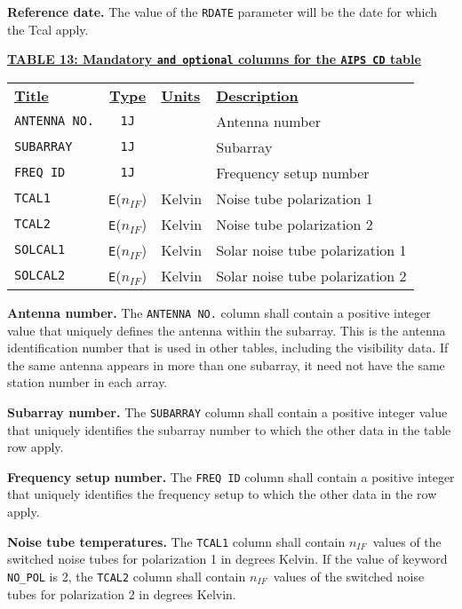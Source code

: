 \documentclass[twoside]{article}
\newcommand{\Hi}[1]{\textcolor{hicol}{#1}}
\newcommand{\nif}{$n_{IF}$}
\begin{document}
{\bf Reference date.} The value of the {\tt RDATE} parameter will be
the date for which the Tcal apply.

\begin{center}
\underline{\bf{TABLE 13: Mandatory \Hi{{\tt and optional}} columns for the {\tt AIPS CD} table}}\\
\begin{tabular}{lcll}
\noalign{\vspace{2pt}} \label{ta:CDcols}
\underline{{\bf Title\vphantom{y}}} & \underline{\bf{Type}} &
   \underline{{\bf Units\vphantom{y}}} & \underline{\bf{Description}} \\
\noalign{\vspace{2pt}}
{\tt ANTENNA NO.} & {\tt 1J} &  & Antenna number \\
{\tt SUBARRAY}    & {\tt 1J} &  & Subarray \\
{\tt FREQ ID}     & {\tt 1J} &  & Frequency setup number \\
{\tt TCAL1}       & {\tt E}(\nif) & Kelvin & Noise tube polarization 1 \\
{\tt TCAL2}       & {\tt E}(\nif) & Kelvin & Noise tube polarization 2 \\
\hline
\Hi{{\tt SOLCAL1}} & \Hi{{\tt E}(\nif)} & \Hi{Kelvin} & \Hi{Solar
  noise tube polarization 1} \\
\Hi{{\tt SOLCAL2}} & \Hi{{\tt E}(\nif)} & \Hi{Kelvin} & \Hi{Solar
  noise tube polarization 2}
\end{tabular}
\end{center}

{\bf Antenna number.} The {\tt ANTENNA NO.} column shall contain a
positive integer value that uniquely defines the antenna within the
subarray.  This is the antenna identification number that is used in
other tables, including the visibility data. If the same antenna
appears in more than one subarray, it need not have the same station
number in each array.

{\bf Subarray number.} The {\tt SUBARRAY} column shall contain a
positive integer value that uniquely identifies the subarray number
to which the other data in the table row apply.

{\bf Frequency setup number.} The {\tt FREQ ID} column shall contain a
positive integer that uniquely identifies the frequency setup to which
the other data in the row apply.

{\bf Noise tube temperatures.} The {\tt TCAL1} column shall contain
\nif\ values of the switched noise tubes for polarization 1 in degrees
Kelvin.  If the value of keyword {\tt NO\_POL} is 2, the {\tt TCAL2}
column shall contain \nif\ values of the switched noise tubes for
polarization 2 in degrees Kelvin.
\end{document}
